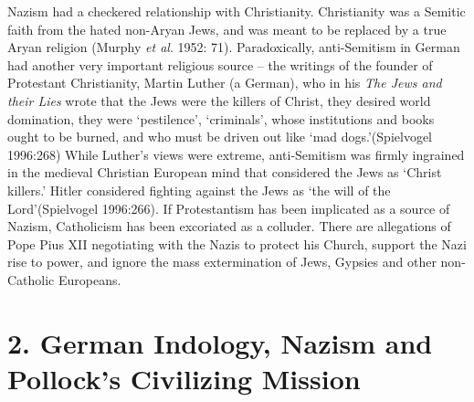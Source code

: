 Nazism had a checkered relationship with Christianity. Christianity was a Semitic faith from the hated non-Aryan Jews, and was meant to be replaced by a true Aryan religion (Murphy \textit{et al}. 1952: 71). Paradoxically, anti-Semitism in German had another very important religious source – the writings of the founder of Protestant Christianity, Martin Luther (a German), who in his \textit{The Jews and their Lies} wrote that the Jews were the killers of Christ, they desired world domination, they were ‘pestilence’, ‘criminals’, whose institutions and books ought to be burned, and who must be driven out like ‘mad dogs.’(Spielvogel 1996:268) While Luther’s views were extreme, anti-Semitism was firmly ingrained in the medieval Christian European mind that considered the Jews as ‘Christ killers.’ Hitler considered fighting against the Jews as ‘the will of the Lord’(Spielvogel 1996:266). If Protestantism has been implicated as a source of Nazism, Catholicism has been excoriated as a colluder. There are allegations of Pope Pius XII negotiating with the Nazis to protect his Church, support the Nazi rise to power, and ignore the mass extermination of Jews, Gypsies and other non-Catholic Europeans.


\section*{2. German Indology, Nazism and Pollock’s Civilizing Mission}

